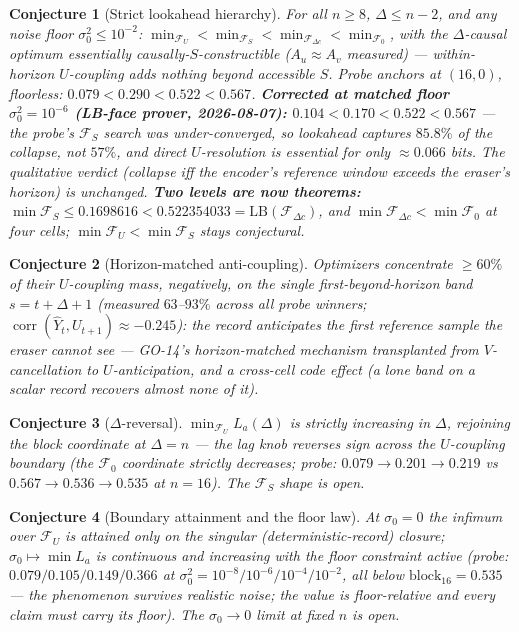 \documentclass[11pt]{article}
\newtheorem{conjecture}{Conjecture}
\begin{document}
\begin{conjecture}[Strict lookahead hierarchy]
For all $n\ge8$, $\Delta\le n-2$, and any noise floor
$\sigma_0^2\le10^{-2}$:
$\min_{\mathcal F_U}<\min_{\mathcal F_S}<\min_{\mathcal F_{\Delta
c}}<\min_{\mathcal F_0}$, with the $\Delta$-causal optimum
essentially causally-$S$-constructible ($A_u\approx A_v$ measured)
--- within-horizon $U$-coupling adds nothing beyond accessible $S$.
Probe anchors at $(16,0)$, floorless: $0.079<0.290<0.522<0.567$.
\textbf{Corrected at matched floor $\sigma_0^2=10^{-6}$ (LB-face
prover, 2026-08-07): $0.104<0.170<0.522<0.567$} --- the probe's
$\mathcal F_S$ search was under-converged, so lookahead captures
$85.8\%$ of the collapse, \emph{not} $57\%$, and direct
$U$-resolution is essential for only ${\approx}0.066$ bits. The
qualitative verdict (collapse iff the encoder's reference window
exceeds the eraser's horizon) is unchanged. \textbf{Two levels are
now theorems:} $\min\mathcal F_S\le0.1698616<0.522354033=
\mathrm{LB}(\mathcal F_{\Delta c})$, and $\min\mathcal
F_{\Delta c}<\min\mathcal F_0$ at four cells;
$\min\mathcal F_U<\min\mathcal F_S$ stays conjectural.
\end{conjecture}

\begin{conjecture}[Horizon-matched anti-coupling]
Optimizers concentrate $\ge60\%$ of their $U$-coupling mass,
negatively, on the single first-beyond-horizon band $s=t+\Delta+1$
(measured $63$--$93\%$ across all probe winners;
$\operatorname{corr}(\hat Y_t,U_{t+1})\approx-0.245$): the record
\emph{anticipates the first reference sample the eraser cannot
see} --- GO-14's horizon-matched mechanism transplanted from
$V$-cancellation to $U$-anticipation, and a cross-cell code effect
(a lone band on a scalar record recovers almost none of it).
\end{conjecture}

\begin{conjecture}[$\Delta$-reversal]
$\min_{\mathcal F_U}L_a(\Delta)$ is strictly increasing in $\Delta$,
rejoining the block coordinate at $\Delta=n$ --- the lag knob
reverses sign across the $U$-coupling boundary (the
$\mathcal F_0$ coordinate strictly decreases; probe: $0.079\to
0.201\to0.219$ vs $0.567\to0.536\to0.535$ at $n=16$). The
$\mathcal F_S$ shape is open.
\end{conjecture}

\begin{conjecture}[Boundary attainment and the floor law]
At $\sigma_0=0$ the infimum over $\mathcal F_U$ is attained only on
the singular (deterministic-record) closure; $\sigma_0\mapsto\min
L_a$ is continuous and increasing with the floor constraint active
(probe: $0.079/0.105/0.149/0.366$ at
$\sigma_0^2=10^{-8}/10^{-6}/10^{-4}/10^{-2}$, all below
$\mathrm{block}_{16}=0.535$ --- the phenomenon survives realistic
noise; the \emph{value} is floor-relative and every claim must
carry its floor). The $\sigma_0\to0$ limit at fixed $n$ is open.
\end{conjecture}
\end{document}
